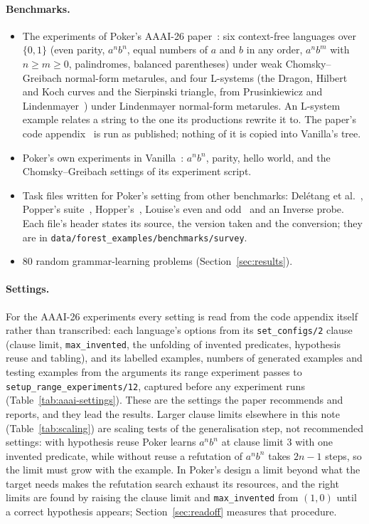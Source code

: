 \documentclass[11pt]{article}
\begin{document}
\paragraph{Benchmarks.}
\begin{itemize}
\item The experiments of Poker's AAAI-26 paper~\cite{ssilp}: six context-free
  languages over $\{0,1\}$ (even parity, $a^nb^n$, equal numbers of $a$ and $b$ in any
  order, $a^nb^m$ with $n \ge m \ge 0$, palindromes, balanced parentheses) under weak
  Chomsky--Greibach normal-form metarules, and four L-systems (the Dragon, Hilbert
  and Koch curves and the Sierpinski triangle, from Prusinkiewicz and
  Lindenmayer~\cite{abop}) under Lindenmayer normal-form metarules. An L-system
  example relates a string to the one its productions rewrite it to. The paper's
  code appendix~\cite{ssilpcode} is run as published; nothing of it is copied into
  Vanilla's tree.
\item Poker's own experiments in Vanilla~\cite{vanilla}: $a^nb^n$, parity, hello
  world, and the Chomsky--Greibach settings of its experiment script.
\item Task files written for Poker's setting from other benchmarks: Del\'etang et
  al.~\cite{deletang}, Popper's suite~\cite{popper}, Hopper's~\cite{hopper}, Louise's
  even and odd~\cite{vanilla,louise} and an Inverse probe. Each file's header states
  its source, the version taken and the conversion; they are in
  \nolinkurl{data/forest_examples/benchmarks/survey}.
\item 80 random grammar-learning problems (Section~\ref{sec:results}).
\end{itemize}

\paragraph{Settings.} For the AAAI-26 experiments every setting is read from the
code appendix itself rather than transcribed: each language's options from its
\nolinkurl{set_configs/2} clause (clause limit, \texttt{max\_invented}, the unfolding
of invented predicates, hypothesis reuse and tabling), and its labelled examples,
numbers of generated examples and testing examples from the arguments its range
experiment passes to \nolinkurl{setup_range_experiments/12}, captured before any
experiment runs (Table~\ref{tab:aaai-settings}). These are the settings the paper
recommends and reports, and they lead the results. Larger clause limits elsewhere
in this note (Table~\ref{tab:scaling}) are scaling tests of the generalisation step,
not recommended settings: with hypothesis reuse Poker learns $a^nb^n$ at clause limit
3 with one invented predicate, while without reuse a refutation of $a^nb^n$ takes
$2n - 1$ steps, so the limit must grow with the example. In Poker's design a limit
beyond what the target needs makes the refutation search exhaust its resources, and
the right limits are found by raising the clause limit and \texttt{max\_invented}
from $(1, 0)$ until a correct hypothesis appears; Section~\ref{sec:readoff} measures
that procedure.
\end{document}
